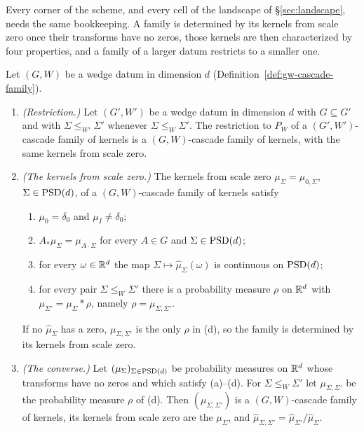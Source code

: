 Every corner of the scheme, and every cell of the landscape of \S\ref{sec:landscape}, needs the same
bookkeeping. A family is determined by its kernels from scale zero once their transforms have no
zeros, those kernels are then characterized by four properties, and a family of a larger datum
restricts to a smaller one.

\begin{lemma}\label{lem:gw-kernels-from-origin}
Let $(G, W)$ be a wedge datum in dimension $d$ (Definition~\ref{def:gw-cascade-family}).
\begin{enumerate}
\item \emph{(Restriction.)} Let $(G', W')$ be a wedge datum in dimension $d$ with $G \subseteq G'$ and
with $\Sigma \le_{W'} \Sigma'$ whenever $\Sigma \le_W \Sigma'$. The restriction to $P_W$ of a
$(G', W')$-cascade family of kernels is a $(G, W)$-cascade family of kernels, with the same kernels from scale zero.
\item \emph{(The kernels from scale zero.)} The kernels from scale zero $\mu_\Sigma = \mu_{0,\Sigma}$,
$\Sigma \in \mathrm{PSD}(d)$, of a $(G, W)$-cascade family of kernels satisfy
\begin{enumerate}
\item[(a)] $\mu_0 = \delta_0$ and $\mu_I \ne \delta_0$;
\item[(b)] $A_*\mu_\Sigma = \mu_{A\cdot\Sigma}$ for every $A \in G$ and $\Sigma \in \mathrm{PSD}(d)$;
\item[(c)] for every $\omega \in \mathbb{R}^d$ the map $\Sigma \mapsto \widehat\mu_\Sigma(\omega)$ is
continuous on $\mathrm{PSD}(d)$;
\item[(d)] for every pair $\Sigma \le_W \Sigma'$ there is a probability measure $\rho$ on $\mathbb{R}^d$ with
$\mu_{\Sigma'} = \mu_\Sigma * \rho$, namely $\rho = \mu_{\Sigma,\Sigma'}$.
\end{enumerate}
If no $\widehat\mu_\Sigma$ has a zero, $\mu_{\Sigma,\Sigma'}$ is the only $\rho$ in (d), so the family is
determined by its kernels from scale zero.
\item \emph{(The converse.)} Let $(\mu_\Sigma)_{\Sigma \in \mathrm{PSD}(d)}$ be probability measures on $\mathbb{R}^d$
whose transforms have no zeros and which satisfy (a)--(d). For $\Sigma \le_W \Sigma'$ let
$\mu_{\Sigma,\Sigma'}$ be the probability measure $\rho$ of (d). Then $(\mu_{\Sigma,\Sigma'})$ is a
$(G, W)$-cascade family of kernels, its kernels from scale zero are the $\mu_\Sigma$, and
$\widehat\mu_{\Sigma,\Sigma'} = \widehat\mu_{\Sigma'}/\widehat\mu_\Sigma$.
\end{enumerate}
\end{lemma}

